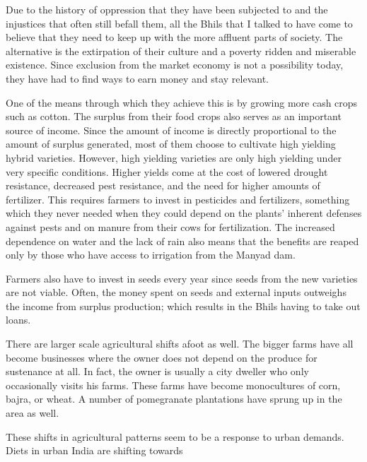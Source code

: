 \documentclass[report.tex]{subfiles}
\begin{document}
Due to the history of oppression that they have been subjected to and the injustices that often still befall them, all the Bhils that I talked to have come to believe that they need to keep up with the more affluent parts of society. The alternative is the extirpation of their culture and a poverty ridden and miserable existence. Since exclusion from the market economy is not a possibility today, they have had to find ways to earn money and stay relevant.

One of the means through which they achieve this is by growing more cash crops such as cotton. The surplus from their food crops also serves as an important source of income. Since the amount of income is directly proportional to the amount of surplus generated, most of them choose to cultivate high yielding hybrid varieties. However, high yielding varieties are only high yielding under very specific conditions. Higher yields come at the cost of lowered drought resistance, decreased pest resistance, and the need for higher amounts of fertilizer. This requires farmers to invest in pesticides and fertilizers, something which they never needed when they could depend on the plants' inherent defenses against pests and on manure from their cows for fertilization. The increased dependence on water and the lack of rain also means that the benefits are reaped only by those who have access to irrigation from the Manyad dam.

Farmers also have to invest in seeds every year since seeds from the new varieties are not viable. Often, the money spent on seeds and external inputs outweighs the income from surplus production; which results in the Bhils having to take out loans.




There are larger scale agricultural shifts afoot as well. The bigger farms have all become businesses where the owner does not depend on the produce for sustenance at all. In fact, the owner is usually a city dweller who only occasionally visits his farms. These farms have become monocultures of corn, bajra, or wheat. A number of pomegranate plantations have sprung up in the area as well.

These shifts in agricultural patterns seem to be a response to urban demands. Diets in urban India are shifting towards 
\end{document}
